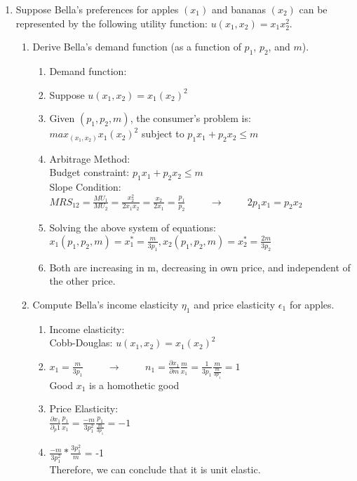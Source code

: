\documentclass[11pt]{article}
\begin{document}
\begin{enumerate}
\pagebreak
\item Suppose Bella's preferences for apples $(x_{1})$ and bananas $(x_{2})$ can be represented by the following utility function: $u(x_{1},x_{2})=x_{1}x_{2}^{2}$.
    \begin{enumerate}
        \item Derive Bella's demand function (as a function of $p_{1}$, $p_{2}$, and $m$).
        \begin{enumerate}
            \item Demand function:
            \item Suppose $u(x_1, x_2) = x_1(x_2)^2$
            \item Given $(p_1, p_2, m)$, the consumer's problem is:\\
            $max_{(x_1, x_2)} x_1(x_2)^2$ subject to $p_1x_1 + p_2x_2 \leq m$
            \item Arbitrage Method:\\
            Budget constraint: $p_1x_1 + p_2x_2 \leq m$\\
            Slope Condition: $MRS_{12} = \frac{MU_1}{MU_2} = \frac{x^2_2}{2x_1x_2} = \frac{x_2}{2x_1} = \frac{p_1}{p_2} \hspace{1cm} \rightarrow \hspace{1cm} 2p_1x_1 = p_2x_2$
            \item Solving the above system of equations:\\
            $x_1(p_1, p_2, m)=x_1^* = \frac{m}{3p_1}, x_2(p_1, p_2, m) = x_2^* = \frac{2m}{3p_2}$
            \item Both are increasing in m, decreasing in own price, and independent of the other price.
        \end{enumerate}

        \item Compute Bella's income elasticity $\eta_{1}$ and price elasticity $\epsilon_{1}$ for apples.
        \begin{enumerate}
            \item Income elasticity: \\
            Cobb-Douglas: $u(x_{1},x_{2}) = x_1(x_2)^2$
            \item $x_1 = \frac{m}{3p_1} \hspace{1cm} \rightarrow \hspace{1cm} n_1 = \frac{\partial x_1}{\partial m} \frac{m}{x_1} = \frac{1}{3p_1} \frac{m}{\frac{m}{3p_1}} = 1$\\
            Good $x_1$ is a homothetic good
            \item Price Elasticity:\\
            $\frac{\partial x_1}{\partial_p1} \frac{p_1}{x_1} = \frac{-m}{3p_1^2} \frac{p_1}{\frac{m}{3p_1}} = -1$
            \item $\frac{-m}{3p_1^2}*\frac{3p_1^2}{m}$ = -1\\
            Therefore, we can conclude that it is unit elastic.
        \end{enumerate}


\end{enumerate}
\end{enumerate}
\end{document}
